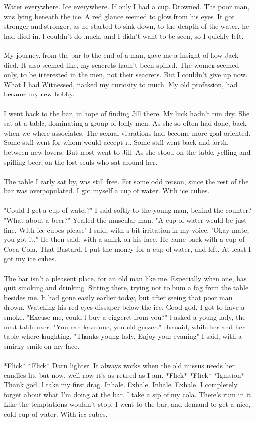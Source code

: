 \documentclass[]{article}
\begin{document}
Water everywhere. Ice everywhere. If only I had a cup. Drowned. The poor man, was lying beneath the ice. A red glance seemed to glow from his eyes. It got stronger and stronger, as he started to sink down, to the deapth of the water, he had died in. I couldn't do much, and I didn't want to be seen, so I quickly left.
\\ \\
My journey, from the bar to the end of a man, gave me a insight of how Jack died. It also seemed like, my seacrets hadn't been spilled. The women seemed only, to be interested in the men, not their seacrets. But I couldn't give up now. What I had Witnessed, nacked my curiosity to much. My old profession, had became my new hobby. 
\\ \\
I went back to the bar, in hope of finding Jill there. My luck hadn't run dry. She sat at a table, dominating a group of lonly men. As she so often had done, back when we where associates. The sexual vibrations had become more goal oriented. Some still went for whom would accept it. Some still went back and forth, between new lovers. But most went to Jill. As she stood on the table, yelling and spilling beer, on the lost souls who sat around her.
\\ \\
The table I early sat by, was still free. For some odd reason, since the rest of the bar was overpopulated. I got myself a cup of water. With ice cubes.
\\ \\
"Could I get a cup of water?" I said softly to the young man, behind the counter?
"What about a beer?" Yealled the muscular man.
"A cup of water would be just fine. With ice cubes please" I said, with a bit irritation in my voice. 
"Okay mate, you got it." He then said, with a smirk on his face. 
He came back with a cup of Coca Cola. That Bastard. I put the money for a cup of water, and left. At least I got my ice cubes.
\\ \\
The bar isn't a pleasent place, for an old man like me. Especially when one, has quit smoking and drinking. Sitting there, trying not to bum a fag from the table besides me. It had gone easily earlier today, but after seeing that poor man drown. Watching his red eyes dissaper below the ice. Good god, I got to have a smoke. "Excuse me, could I buy a ciggeret from you?" I asked a young lady, the next table over. "You can have one, you old geezer." she said, while her and her table where laughting. "Thanks young lady. Enjoy your evaning" I said, with a smirky smile on my face. 
\\ \\
*Flick* *Flick* Darn lighter. It always works when the old missus needs her candles lit, but now, well now it's as retired as I am. *Flick* *Flick* *Ignition* Thank god. I take my first drag. Inhale. Exhale. Inhale. Exhale. I completely forget about what I'm doing at the bar. I take a sip of my cola. There's rum in it. Like the temptations wouldn't stop. I went to the bar, and demand to get a nice, cold cup of water. With ice cubes.
\end{document}
